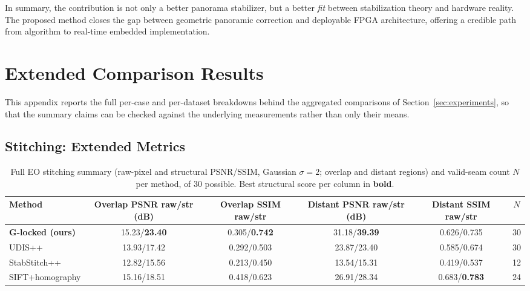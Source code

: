 \documentclass[journal]{IEEEtran}
\begin{document}
In summary, the contribution is not only a better panorama stabilizer, but a better \emph{fit} between stabilization theory and hardware reality. The proposed method closes the gap between geometric panoramic correction and deployable FPGA architecture, offering a credible path from algorithm to real-time embedded implementation.

\appendices
\setlength{\textfloatsep}{7pt plus 1pt minus 2pt}
\setlength{\floatsep}{6pt plus 1pt minus 2pt}
\setlength{\dbltextfloatsep}{7pt plus 1pt minus 2pt}
\setlength{\dblfloatsep}{6pt plus 1pt minus 2pt}
\setlength{\intextsep}{6pt plus 1pt minus 2pt}
\setlength{\abovecaptionskip}{3pt plus 1pt minus 1pt}
\setlength{\belowcaptionskip}{3pt plus 1pt minus 1pt}
\section{Extended Comparison Results}
\label{app:extended}
This appendix reports the full per-case and per-dataset breakdowns behind the aggregated comparisons of Section~\ref{sec:experiments}, so that the summary claims can be checked against the underlying measurements rather than only their means.

\subsection{Stitching: Extended Metrics}

\begin{table}[!t]
\caption{Full EO stitching summary (raw-pixel and structural PSNR/SSIM, Gaussian $\sigma{=}2$; overlap and distant regions) and valid-seam count $N$ per method, of $30$ possible. Best structural score per column in \textbf{bold}.}
\label{tab:eofull}
\centering
\footnotesize
\begin{tabularx}{\textwidth}{@{}Yccccc@{}}
\toprule
Method & Overlap PSNR raw/str (dB) & Overlap SSIM raw/str & Distant PSNR raw/str (dB) & Distant SSIM raw/str & $N$ \\
\midrule
\textbf{G-locked (ours)} & 15.23/\textbf{23.40} & 0.305/\textbf{0.742} & 31.18/\textbf{39.39} & 0.626/0.735 & 30 \\
UDIS++           & 13.93/17.42 & 0.292/0.503 & 23.87/23.40 & 0.585/0.674 & 30 \\
StabStitch++     & 12.82/15.56 & 0.213/0.450 & 13.54/15.31 & 0.419/0.537 & 12 \\
SIFT+homography  & 15.16/18.51 & 0.418/0.623 & 26.91/28.34 & 0.683/\textbf{0.783} & 24 \\
\bottomrule
\end{tabularx}
\end{table}
\end{document}
